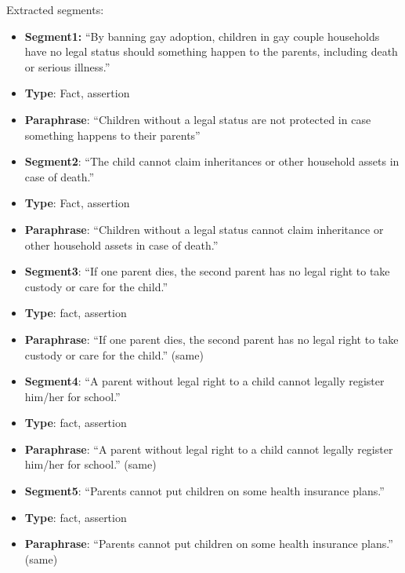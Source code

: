 \noindent Extracted segments:
\begin{itemize}
\item[] \textbf{Segment1:} ``By banning gay adoption, children in gay couple
households have no legal status should something happen to the parents,
including death or serious illness.''
\item[] \textbf{Type}: Fact, assertion
\item[] \textbf{Paraphrase}: ``Children without a legal status are not
protected in case something happens to their parents''
\end{itemize}

\begin{itemize}[topsep=0.3cm]
\item[] \textbf{Segment2}: ``The child cannot claim inheritances or other household assets in case of death.''
\item[] \textbf{Type}: Fact, assertion
\item[] \textbf{Paraphrase}: ``Children without a legal status cannot claim
inheritance or other household assets in case of death.''
\end{itemize} 

\begin{itemize}[topsep=0.3cm]
\item[] \textbf{Segment3}: ``If one parent dies, the second parent has no legal
right to take custody or care for the child.''
\item[] \textbf{Type}: fact, assertion
\item[] \textbf{Paraphrase}: ``If one parent dies, the second parent has no legal
right to take custody or care for the child.'' (same)

\end{itemize}

\begin{itemize}[topsep=0.3cm]
\item[] \textbf{Segment4}: ``A parent without legal right to a child cannot
legally register him/her for school.''
\item[] \textbf{Type}: fact, assertion
\item[] \textbf{Paraphrase}: ``A parent without legal right to a child cannot
legally register him/her for school.'' (same)
\end{itemize}

\begin{itemize}[topsep=0.3cm]
\item[] \textbf{Segment5}: ``Parents cannot put children on some health insurance plans.''
\item[] \textbf{Type}: fact, assertion
\item[] \textbf{Paraphrase}: ``Parents cannot put children on some health insurance plans.'' (same)

\end{itemize}

